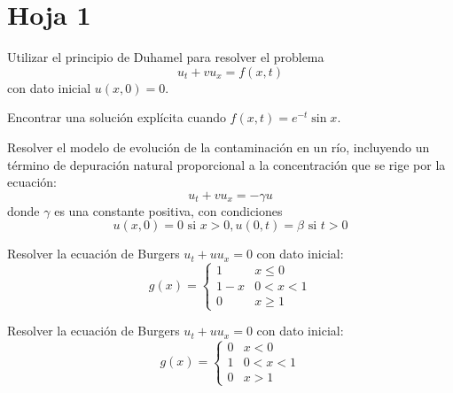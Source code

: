 \section{Hoja 1}


\begin{problem}[1]

	\ppart Utilizar el principio de Duhamel para resolver el problema
	\[ u_t + v u_x = f(x,t) \]
	con dato inicial $u(x,0) = 0$.

	Encontrar una solución explícita cuando $f(x,t) = e^{-t} \sin x$.

	\ppart Resolver el modelo de evolución de la contaminación en un río, incluyendo un término de depuración natural proporcional a la concentración que se rige por la ecuación:
	\[ u_t + vu_x = -\gamma u \]
	donde $\gamma$ es una constante positiva, con condiciones
	\[ u(x,0) = 0 \text{ si } x > 0, u(0,t) = \beta \text{ si } t > 0 \]

	\solution


\end{problem}











\begin{problem}[2] Resolver la ecuación de Burgers $u_t + uu_x = 0$ con dato inicial:
	\[ g(x) =
	\begin{cases}
		1 & x \leq 0 \\
		1-x & 0 < x < 1 \\
		0 & x \geq 1
	\end{cases} \]

	\solution

\end{problem}











\begin{problem}[3] Resolver la ecuación de Burgers $u_t + uu_x = 0$ con dato inicial:
	\[ g(x) =
	\begin{cases}
		0 & x < 0 \\
		1 & 0 < x < 1 \\
		0 & x > 1
	\end{cases} \]

	\solution


\end{problem}












